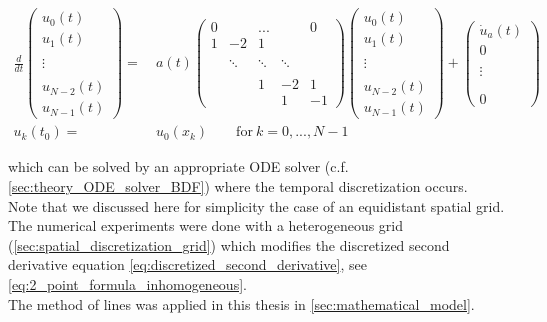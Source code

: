 \documentclass{scrartcl}[12pt, halfparskip]
\numberwithin{equation}{section}
\numberwithin{figure}{section}
\numberwithin{table}{section}
\begin{document}
\begin{align}
	\frac{d}{dt}
	\begin{pmatrix}
		u_0(t) \\
		u_1(t) \\
		\\
		\vdots \\
		\\
		u_{N-2}(t) \\
		u_{N-1}(t)
	\end{pmatrix}
	= & \ a(t) 
	\begin{pmatrix}
		0 & & ... & & 0 \\
		1 & -2 & 1 \\
		\\
		& \ddots & \ddots & \ddots \\
		\\
		& & 1 & -2 & 1 \\
		& & & 1 & -1
	\end{pmatrix}
	\begin{pmatrix}
	u_0(t) \\
	u_1(t) \\
	\\
	\vdots \\
	\\
	u_{N-2}(t) \\
	u_{N-1}(t)
	\end{pmatrix}
	+
	\begin{pmatrix}
		\dot{u}_a(t) \\
		0 \\
		\\
		\vdots \\
		\\
		\\
		0
	\end{pmatrix} \\
	u_k(t_0) = & \ u_0(x_k) \qquad \text{for} \ k = 0,...,N-1 \nonumber
\end{align}
 
 which can be solved by an appropriate ODE solver (c.f. \cref{sec:theory_ODE_solver_BDF}) where the temporal discretization occurs. \\
 Note that we discussed here for simplicity the case of an equidistant spatial grid. The numerical experiments were done with a heterogeneous grid (\cref{sec:spatial_discretization_grid}) which modifies the discretized second derivative equation \eqref{eq:discretized_second_derivative}, see \cref{eq:2_point_formula_inhomogeneous}. \\
 The method of lines was applied in this thesis in \cref{sec:mathematical_model}.
\end{document}
